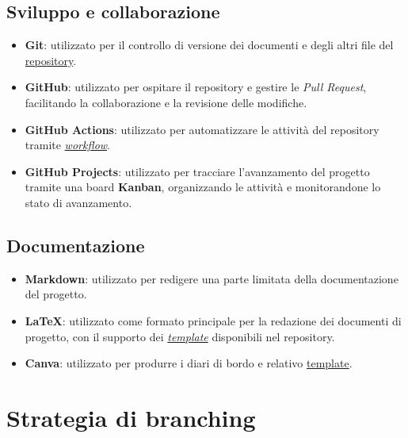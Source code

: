 \documentclass[11pt, a4paper]{article}
\begin{document}
\subsection{Sviluppo e collaborazione}
\begin{itemize}
    \item \textbf{Git}: utilizzato per il controllo di versione dei documenti e degli altri file del \href{https://github.com/On-By-One-Team/On-By-One.github.io}{repository}.
    \item \textbf{GitHub}: utilizzato per ospitare il repository e gestire le \textit{Pull Request}, facilitando la collaborazione e la revisione delle modifiche.
    \item \textbf{GitHub Actions}: utilizzato per automatizzare le attività del repository tramite \href{https://github.com/On-By-One-Team/On-By-One.github.io/tree/main/.github/workflows}{\textit{workflow}}.
    \item \textbf{GitHub Projects}: utilizzato per tracciare l'avanzamento del progetto tramite una board \textbf{Kanban}, organizzando le attività e monitorandone lo stato di avanzamento.
\end{itemize}

\subsection{Documentazione}
\begin{itemize}
    \item \textbf{Markdown}: utilizzato per redigere una parte limitata della documentazione del progetto.
    \item \textbf{LaTeX}: utilizzato come formato principale per la redazione dei documenti di progetto, con il supporto dei \href{https://github.com/On-By-One-Team/On-By-One.github.io/tree/main/docs/tex/templates}{\textit{template}} disponibili nel repository.
    \item \textbf{Canva}: utilizzato per produrre i diari di bordo e relativo \href{https://www.canva.com/design/DAXYpWf746s/uXPPm-JCKg6TbuRorlvcWQ/view?utm_content=DAXYpWf746s&utm_campaign=designshare&utm_medium=link&utm_source=publishsharelink&mode=preview}{template}.
\end{itemize}

\section{Strategia di branching}
\label{sec:strategia-di-branching}
\end{document}
